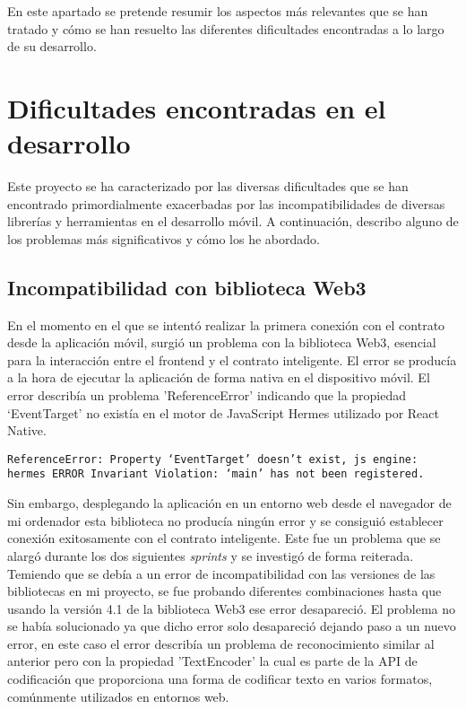 
En este apartado se pretende resumir los aspectos más relevantes que se han tratado y cómo se han resuelto las diferentes dificultades encontradas a lo largo de su desarrollo.


\section{Dificultades encontradas en el desarrollo}

Este proyecto se ha caracterizado por las diversas dificultades que se han encontrado primordialmente exacerbadas por las incompatibilidades de diversas librerías y herramientas en el desarrollo móvil.
A continuación, describo alguno de los problemas más significativos y cómo los he abordado.

\subsection{Incompatibilidad con biblioteca Web3}

En el momento en el que se intentó realizar la primera conexión con el contrato desde la aplicación móvil, surgió un problema con la biblioteca Web3, esencial para la interacción entre el frontend y el contrato inteligente.
El error se producía a la hora de ejecutar la aplicación de forma nativa en el dispositivo móvil.
El error describía un problema 'ReferenceError' indicando que la propiedad `EventTarget' no existía en el motor de JavaScript Hermes utilizado por React Native. 

\texttt{ReferenceError: Property `EventTarget' doesn't exist, js engine: hermes ERROR Invariant Violation: `main' has not been registered.}

Sin embargo, desplegando la aplicación en un entorno web desde el navegador de mi ordenador esta biblioteca no producía ningún error y se consiguió establecer conexión exitosamente con el contrato inteligente.
Este fue un problema que se alargó durante los dos siguientes \textit{sprints} y se investigó de forma reiterada. Temiendo que se debía a un error de incompatibilidad con las versiones de las bibliotecas en mi proyecto, se fue probando diferentes combinaciones hasta que usando la versión 4.1 de la biblioteca Web3 ese error desapareció.
El problema no se había solucionado ya que dicho error solo desapareció dejando paso a un nuevo error, en este caso el error describía un problema de reconocimiento similar al anterior pero con la propiedad 'TextEncoder' la cual es parte de la API de codificación que proporciona una forma de codificar texto en varios formatos, comúnmente utilizados en entornos web.

